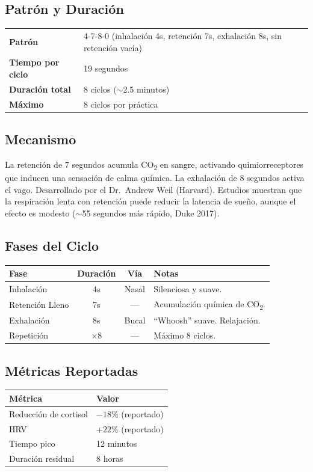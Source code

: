 \documentclass[12pt,a4paper]{article}
\begin{document}
\subsection*{Patrón y Duración}
\begin{tabularx}{\textwidth}{lX}
    \textbf{Patrón} & 4-7-8-0 (inhalación 4s, retención 7s, exhalación 8s, sin retención vacía) \\
    \textbf{Tiempo por ciclo} & 19 segundos \\
    \textbf{Duración total} & 8 ciclos ($\sim$2.5 minutos) \\
    \textbf{Máximo} & 8 ciclos por práctica \\
\end{tabularx}

\subsection*{Mecanismo}
La retención de 7 segundos acumula CO\textsubscript{2} en sangre, activando
quimiorreceptores que inducen una sensación de calma química. La exhalación de
8 segundos activa el vago. Desarrollado por el Dr.~Andrew Weil (Harvard).
Estudios muestran que la respiración lenta con retención puede reducir la
latencia de sueño, aunque el efecto es modesto ($\sim$55 segundos más rápido,
Duke 2017).

\subsection*{Fases del Ciclo}
\begin{tabularx}{\textwidth}{lccX}
    \toprule
    \textbf{Fase} & \textbf{Duración} & \textbf{Vía} & \textbf{Notas} \\
    \midrule
    Inhalación & 4s & Nasal & Silenciosa y suave. \\
    Retención Lleno & 7s & — & Acumulación química de CO\textsubscript{2}. \\
    Exhalación & 8s & Bucal & ``Whoosh'' suave. Relajación. \\
    Repetición & $\times$8 & — & Máximo 8 ciclos. \\
    \bottomrule
\end{tabularx}

\subsection*{Métricas Reportadas}
\begin{tabularx}{\textwidth}{lX}
    \toprule
    \textbf{Métrica} & \textbf{Valor} \\
    \midrule
    Reducción de cortisol & $-18\%$ (reportado) \\
    HRV & $+22\%$ (reportado) \\
    Tiempo pico & 12 minutos \\
    Duración residual & 8 horas \\
    \bottomrule
\end{tabularx}
\end{document}
